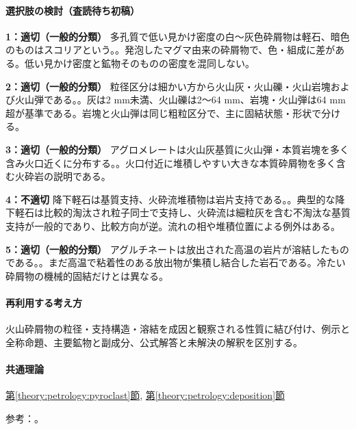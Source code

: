 \paragraph{選択肢の検討（査読待ち初稿）}\mbox{}\par

\noindent\textbf{1：適切（一般的分類）} 多孔質で低い見かけ密度の白〜灰色砕屑物は軽石、暗色のものはスコリアという。。発泡したマグマ由来の砕屑物で、色・組成に差がある。低い見かけ密度と鉱物そのものの密度を混同しない。\par

\noindent\textbf{2：適切（一般的分類）} 粒径区分は細かい方から火山灰・火山礫・火山岩塊および火山弾である。。灰は2 mm未満、火山礫は2〜64 mm、岩塊・火山弾は64 mm超が基準である。岩塊と火山弾は同じ粗粒区分で、主に固結状態・形状で分ける。\par

\noindent\textbf{3：適切（一般的分類）} アグロメレートは火山灰基質に火山弾・本質岩塊を多く含み火口近くに分布する。。火口付近に堆積しやすい大きな本質砕屑物を多く含む火砕岩の説明である。\par

\noindent\textbf{4：不適切} 降下軽石は基質支持、火砕流堆積物は岩片支持である。。典型的な降下軽石は比較的淘汰され粒子同士で支持し、火砕流は細粒灰を含む不淘汰な基質支持が一般的であり、比較方向が逆。流れの相や堆積位置による例外はある。\par

\noindent\textbf{5：適切（一般的分類）} アグルチネートは放出された高温の岩片が溶結したものである。。まだ高温で粘着性のある放出物が集積し結合した岩石である。冷たい砕屑物の機械的固結だけとは異なる。\par

\paragraph{再利用する考え方} 火山砕屑物の粒径・支持構造・溶結を成因と観察される性質に結び付け、例示と全称命題、主要鉱物と副成分、公式解答と未解決の解釈を区別する。

\paragraph{共通理論} \hyperref[theory:petrology:pyroclast]{第\ref*{theory:petrology:pyroclast}節}, \hyperref[theory:petrology:deposition]{第\ref*{theory:petrology:deposition}節}

\par 参考：\cite{usgs_tephra_sizes,usgs_pinatubo1996,usgs_ash_density,usgs_bishop_tuff}。

